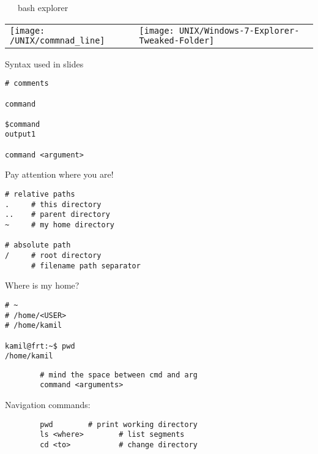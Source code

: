 \documentclass[xcolor=dvipsnames]{beamer}
\begin{document}
\begin{frame}
	~~~bash \hfill explorer~~~
	\begin{center}
	\begin{tabular}{L{0.5\textwidth}L{0.5\textwidth}}
		\texttt{[image: /UNIX/commnad\_line]} &
		\texttt{[image: UNIX/Windows-7-Explorer-Tweaked-Folder]} \\
	\end{tabular}
	\end{center}
\end{frame}

\begin{frame}[fragile]
Syntax used in slides
\begin{verbatim}
# comments

command

$command
output1

command <argument>
\end{verbatim}
\end{frame}

\begin{frame}[fragile]
Pay attention where you are!
\begin{verbatim}
# relative paths
.     # this directory
..    # parent directory
~     # my home directory

# absolute path
/     # root directory
      # filename path separator

\end{verbatim}
\end{frame}

\begin{frame}[fragile]
Where is my home?
\begin{verbatim}
# ~
# /home/<USER>
# /home/kamil

kamil@frt:~$ pwd
/home/kamil
\end{verbatim}

\end{frame}


\begin{frame}[fragile]
	\begin{verbatim}
		# mind the space between cmd and arg
		command <arguments>
	\end{verbatim}
	Navigation commands:
	\begin{verbatim}
		pwd        # print working directory
		ls <where>        # list segments
		cd <to>           # change directory
	\end{verbatim}
\end{frame}
\end{document}
